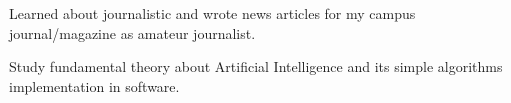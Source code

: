 \documentclass[10pt, a4paper]{moderncv}
\begin{document}
{
    \begin{scriptsize}
    Learned about journalistic and wrote news articles for my campus journal/magazine as amateur journalist.\\
    \end{scriptsize}
}
{
    \begin{scriptsize}
    Study fundamental theory about Artificial Intelligence and its simple algorithms implementation in software.\\
    \end{scriptsize}
}


\end{document}

